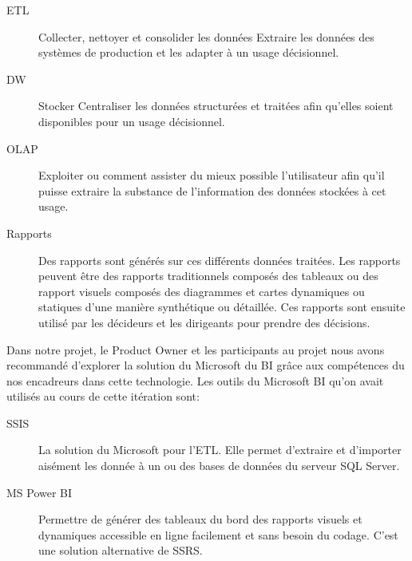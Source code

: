 \begin{description}
    \item [\acrfull{ETL}] Collecter, nettoyer et consolider les données
        Extraire les données des systèmes de production et les adapter à un
        usage décisionnel.
    \item [\acrfull{DW}] Stocker Centraliser les données structurées et
        traitées afin qu'elles soient disponibles pour un usage décisionnel.
    \item [\acrfull{OLAP}] Exploiter ou comment assister du mieux possible
        l'utilisateur afin qu'il puisse extraire la substance de l'information
        des données stockées à cet usage.
    \item [Rapports] Des rapports sont générés sur ces différents données
        traitées. Les rapports peuvent être des rapports traditionnels composés
        des tableaux ou des rapport visuels composés des diagrammes et cartes
        dynamiques ou statiques d'une manière synthétique ou détaillée. Ces
        rapports sont ensuite utilisé par les décideurs et les dirigeants pour
        prendre des décisions.
\end{description}

Dans notre projet, le Product Owner et les participants au projet nous avons
recommandé d'explorer la solution du Microsoft du BI grâce aux compétences du
nos encadreurs dans cette technologie. Les outils du Microsoft BI qu'on avait
utilisés au cours de cette itération sont:

\begin{description}
    \item [\acrfull{SSIS}] La solution du Microsoft pour l'\acrshort{ETL}. Elle
        permet d'extraire et d'importer aisément les donnée à un ou des bases
        de données du serveur SQL Server.
    \item [MS Power BI] Permettre de générer des tableaux du bord des rapports
        visuels et dynamiques accessible en ligne facilement et sans besoin du
        codage. C'est une solution alternative de \acrfull{SSRS}.
\end{description}


